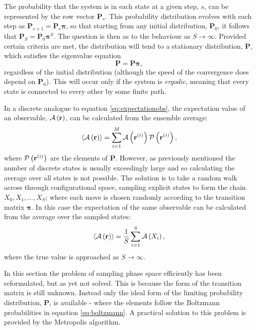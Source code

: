The probability that the system is in each state at a given step, $s$, can be represented by the row vector $\mathbf{P}_s$.
This probability distribution evolves with each step as $\mathbf{P}_{s+1}=\mathbf{P}_{s}\bm{\pi}$, so that starting from any initial distribution, $\mathbf{P}_0$, it follows that $\mathbf{P}_S=\mathbf{P}_0\bm{\pi}^S$. 
The question is then as to the behaviour as $S\rightarrow \infty$.
Provided certain criteria are met, the distribution will tend to a stationary distribution, $\mathbf{P}$, which satisfies the eigenvalue equation 
\begin{equation}
	\mathbf{P} = \mathbf{P}\bm{\pi}, \label{eq:mcmceig}
\end{equation}
regardless of the initial distribution (although the speed of the convergence does depend on $\mathbf{P}_0$).
This will occur only if the system is \textit{ergodic}, meaning that every state is connected to every other by some finite path.

In a discrete analogue to equation \eqref{eq:expectationobs}, the expectation value of an observable, $\mathcal{A}\left(\mathbf{r}\right)$, can be calculated from the ensemble average:
\begin{equation}
	\langle \mathcal{A}\left(\mathbf{r}\right) \rangle = \sum_{i=1}^{M} \mathcal{A}\left(\mathbf{r}^{\left(i\right)}\right)\mathcal{P}\left(\mathbf{r}^{\left(i\right)}\right),
\end{equation}
where $\mathcal{P}\left(\mathbf{r}^{\left(i\right)}\right)$ are the elements of $\mathbf{P}$.
However, as previously mentioned the number of discrete states is usually exceedingly large and so calculating the average over all states is not possible.
The solution is to take a random walk across through configurational space, sampling explicit states to form the chain $X_0,X_1,\dots,X_S$; where each move is chosen randomly according to the transition matrix $\bm{\pi}$.
In this case the expectation of the same observable can be calculated from the average over the sampled states:
\begin{equation}
	\langle \mathcal{A}\left(\mathbf{r}\right) \rangle = \frac{1}{S}\sum_{i=1}^{S} \mathcal{A}\left(X_i\right),
\end{equation}
where the true value is approached as $S\rightarrow \infty$.

In this section the problem of sampling phase space efficiently has been reformulated, but as yet not solved. 
This is because the form of the transition matrix is still unknown.
Instead only the ideal form of the limiting probability distribution, $\mathbf{P}$, is available \-- where the elements follow the Boltzmann probabilities in equation \eqref{eq:boltzmann}.
A practical solution to this problem is provided by the Metropolis algorithm.

